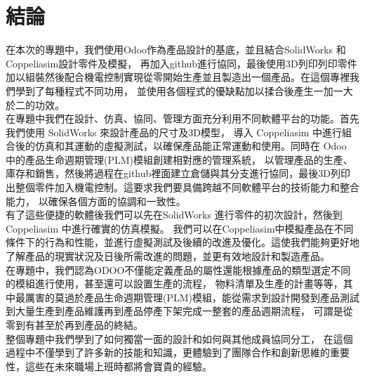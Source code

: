 \chapter{結論}
\renewcommand{\baselinestretch}{10.0} %


\fontsize{14pt}{2.5pt}\sectionef\hspace{12pt}


在本次的專題中，我們使用Odoo作為產品設計的基底，並且結合SolidWorks 和 Coppeliasim設計零件及模擬，
再加入github進行協同，最後使用3D列印列印零件加以組裝然後配合機電控制實現從零開始生產並且製造出一個產品。在這個專裡我們學到了每種程式不同功用，
並使用各個程式的優缺點加以揉合後產生一加一大於二的功效。\\



在專題中我們在設計、仿真、協同、管理方面充分利用不同軟體平台的功能。首先我們使用 SolidWorks 來設計產品的尺寸及3D模型，
導入 Coppeliasim 中進行組合後的仿真和其運動的虛擬測試，以確保產品能正常運動和使用。同時在 Odoo 中的產品生命週期管理(PLM)模組創建相對應的管理系統，
以管理產品的生產、庫存和銷售，然後將過程在github裡面建立倉儲與其分支進行協同，最後3D列印出整個零件加入機電控制。這要求我們要具備跨越不同軟體平台的技術能力和整合能力，
以確保各個方面的協調和一致性。\\


有了這些便捷的軟體後我們可以先在SolidWorks 進行零件的初次設計，然後到Coppeliasim 中進行確實的仿真模擬。
我們可以在Coppeliasim中模擬產品在不同條件下的行為和性能，並進行虛擬測試及後續的改進及優化。這使我們能夠更好地了解產品的現實狀況及日後所需改進的問題，並更有效地設計和製造產品。\\


在專題中，我們認為ODOO不僅能定義產品的屬性還能根據產品的類型選定不同的模組進行使用，甚至還可以設置生產的流程，
物料清單及生產的計畫等等，其中最厲害的莫過於產品生命週期管理(PLM)模組，能從需求到設計開發到產品測試到大量生產到產品維護再到產品停產下架完成一整套的產品週期流程，
可謂是從零到有甚至於再到產品的終結。\\


整個專題中我們學到了如何獨當一面的設計和如何與其他成員協同分工，
在這個過程中不僅學到了許多新的技能和知識，更體驗到了團隊合作和創新思維的重要性，這些在未來職場上班時都將會寶貴的經驗。\\




\newpage

\renewcommand{\baselinestretch}{0.5} %